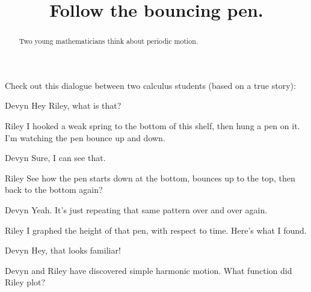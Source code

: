 \documentclass{ximera}
\title[Break-Ground:]{Follow the bouncing pen.}
\begin{document}
\begin{abstract}
  Two young mathematicians think about periodic motion.
\end{abstract}
\maketitle

Check out this dialogue between two calculus students (based on a true
story):

\begin{dialogue}
\item[Devyn] Hey Riley, what is that?
\item[Riley] I hooked a weak spring to the bottom of this shelf, then hung a pen on it.  I'm watching the pen bounce up and down.
\item[Devyn] Sure, I can see that.
\item[Riley] See how the pen starts down at the bottom, bounces up to the top, then back to the bottom again?
\item[Devyn] Yeah.  It's just repeating that same pattern over and over again.
\item[Riley] I graphed the height of that pen, with respect to time.   Here's what I found.
 \begin{image}
  \end{image}
\item[Devyn] Hey, that looks familiar!
\end{dialogue}

\begin{problem}
  Devyn and Riley have discovered simple harmonic motion.  What function did Riley plot?
   \begin{multipleChoice}
  \end{multipleChoice}
\end{problem}
\end{document}
